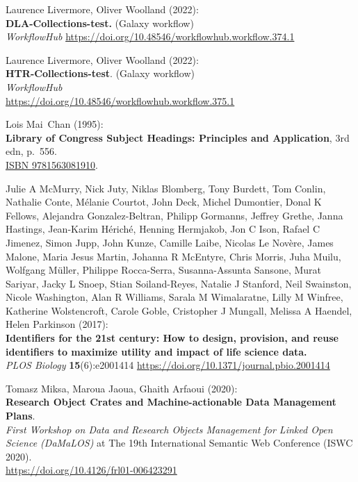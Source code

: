 \begin{thebibliography}{9}
Laurence Livermore, Oliver Woolland (2022):\\
\textbf{DLA-Collections-test.} (Galaxy workflow)\\
\emph{WorkflowHub}
\url{https://doi.org/10.48546/workflowhub.workflow.374.1}

Laurence Livermore, Oliver Woolland (2022):\\
\textbf{HTR-Collections-test}. (Galaxy workflow)\\
\emph{WorkflowHub}\\
\url{https://doi.org/10.48546/workflowhub.workflow.375.1}

Lois Mai~Chan (1995):\\
\textbf{Library of Congress Subject Headings: Principles and
Application}, 3rd edn, p.~556.\\
\href{https://identifiers.org/isbn/9781563081910}{ISBN 9781563081910}.

Julie A McMurry, Nick Juty, Niklas Blomberg, Tony
Burdett, Tom Conlin, Nathalie Conte, Mélanie Courtot, John Deck, Michel
Dumontier, Donal K Fellows, Alejandra Gonzalez-Beltran, Philipp
Gormanns, Jeffrey Grethe, Janna Hastings, Jean-Karim Hériché, Henning
Hermjakob, Jon C Ison, Rafael C Jimenez, Simon Jupp, John Kunze, Camille
Laibe, Nicolas Le Novère, James Malone, Maria Jesus Martin, Johanna R
McEntyre, Chris Morris, Juha Muilu, Wolfgang Müller, Philippe
Rocca-Serra, Susanna-Assunta Sansone, Murat Sariyar, Jacky L Snoep,
Stian Soiland-Reyes, Natalie J Stanford, Neil Swainston, Nicole
Washington, Alan R Williams, Sarala M Wimalaratne, Lilly M Winfree,
Katherine Wolstencroft, Carole Goble, Cristopher J Mungall, Melissa A
Haendel, Helen Parkinson (2017):\\
\textbf{Identifiers for the 21st century: How to design, provision, and
reuse identifiers to maximize utility and impact of life science
data.}\\
\emph{PLOS Biology} \textbf{15}(6):e2001414
\url{https://doi.org/10.1371/journal.pbio.2001414}

Tomasz Miksa, Maroua Jaoua, Ghaith Arfaoui (2020):\\
\textbf{Research Object Crates and Machine-actionable Data Management
Plans}.\\
\emph{First Workshop on Data and Research Objects Management for Linked
Open Science (DaMaLOS)} at The 19th International Semantic Web
Conference (ISWC 2020).\\
\url{https://doi.org/10.4126/frl01-006423291}


\end{thebibliography}
